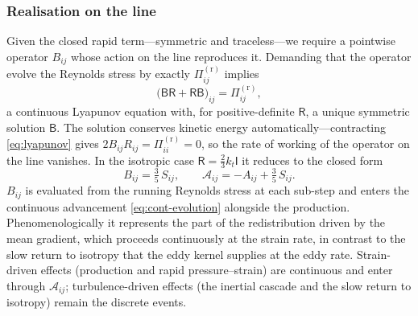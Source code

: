 \documentclass[lineno]{JFM-FLM_Au}
\begin{document}
\subsubsection{Realisation on the line}\label{sec:line-realisation}

Given the closed rapid term---symmetric and traceless---we require a
pointwise operator $B_{ij}$ whose action on the line reproduces it.
Demanding that the operator evolve the Reynolds stress by exactly
$\Pi^{(\mathrm r)}_{ij}$ implies
\begin{equation}
  \big(\mathsf{B}\mathsf{R}+\mathsf{R}\mathsf{B}\big)_{ij}
  = \Pi^{(\mathrm r)}_{ij},
  \label{eq:lyapunov}
\end{equation}
a continuous Lyapunov equation with, for positive-definite
$\mathsf{R}$, a unique symmetric solution $\mathsf{B}$. The solution
conserves kinetic energy automatically---contracting \eqref{eq:lyapunov}
gives $2B_{ij}R_{ij}=\Pi^{(\mathrm r)}_{ii}=0$, so the rate of working of
the operator on the line vanishes. In the isotropic case
$\mathsf{R}=\tfrac23k_t\mathsf{I}$ it reduces to the closed form
\begin{equation}
  B_{ij} = \tfrac{3}{5}\,S_{ij},
  \qquad
  \mathcal{A}_{ij} = -A_{ij} + \tfrac{3}{5}\,S_{ij}.
  \label{eq:iso-B}
\end{equation}
$B_{ij}$ is evaluated from the running Reynolds stress at each sub-step
and enters the continuous advancement \eqref{eq:cont-evolution}
alongside the production. Phenomenologically it represents the part of
the redistribution driven by the mean gradient, which proceeds
continuously at the strain rate, in contrast to the slow return to
isotropy that the eddy kernel supplies at the eddy rate. Strain-driven effects (production and
rapid pressure--strain) are continuous and enter through
$\mathcal{A}_{ij}$; turbulence-driven effects (the inertial cascade and
the slow return to isotropy) remain the discrete events.
\end{document}
